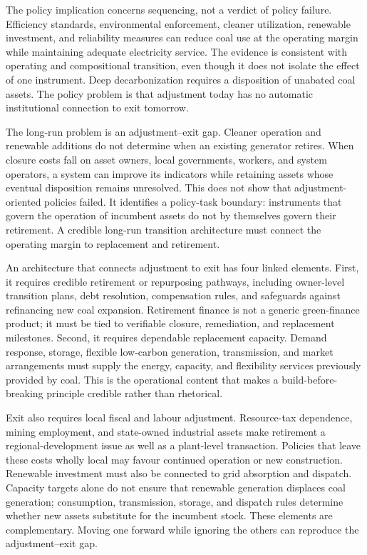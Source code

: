 \documentclass[11pt]{article}
\begin{document}
The policy implication concerns sequencing, not a verdict of policy failure. Efficiency standards, environmental enforcement, cleaner utilization, renewable investment, and reliability measures can reduce coal use at the operating margin while maintaining adequate electricity service. The evidence is consistent with operating and compositional transition, even though it does not isolate the effect of one instrument. Deep decarbonization requires a disposition of unabated coal assets. The policy problem is that adjustment today has no automatic institutional connection to exit tomorrow.

The long-run problem is an adjustment--exit gap. Cleaner operation and renewable additions do not determine when an existing generator retires. When closure costs fall on asset owners, local governments, workers, and system operators, a system can improve its indicators while retaining assets whose eventual disposition remains unresolved. This does not show that adjustment-oriented policies failed. It identifies a policy-task boundary: instruments that govern the operation of incumbent assets do not by themselves govern their retirement. A credible long-run transition architecture must connect the operating margin to replacement and retirement.

An architecture that connects adjustment to exit has four linked elements. First, it requires credible retirement or repurposing pathways, including owner-level transition plans, debt resolution, compensation rules, and safeguards against refinancing new coal expansion. Retirement finance is not a generic green-finance product; it must be tied to verifiable closure, remediation, and replacement milestones. Second, it requires dependable replacement capacity. Demand response, storage, flexible low-carbon generation, transmission, and market arrangements must supply the energy, capacity, and flexibility services previously provided by coal. This is the operational content that makes a build-before-breaking principle credible rather than rhetorical.

Exit also requires local fiscal and labour adjustment. Resource-tax dependence, mining employment, and state-owned industrial assets make retirement a regional-development issue as well as a plant-level transaction. Policies that leave these costs wholly local may favour continued operation or new construction. Renewable investment must also be connected to grid absorption and dispatch. Capacity targets alone do not ensure that renewable generation displaces coal generation; consumption, transmission, storage, and dispatch rules determine whether new assets substitute for the incumbent stock. These elements are complementary. Moving one forward while ignoring the others can reproduce the adjustment--exit gap.
\end{document}
